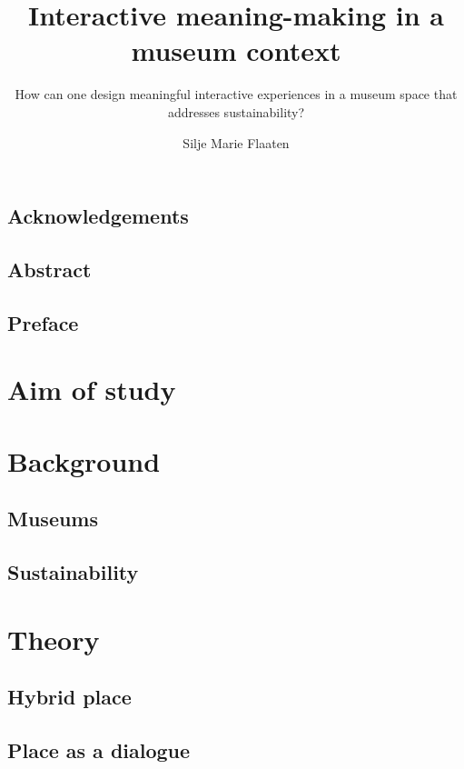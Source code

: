 \documentclass[UKenglish]{ifimaster}
\title{Interactive meaning-making in a museum context}
\subtitle{How can one design meaningful interactive experiences in a museum space that addresses sustainability?}
\author{Silje Marie Flaaten}
\begin{document}
\duoforside[dept={Department of Informatics}, program={Informatics: design, use, interaction},long]



\frontmatter{}
\chapter*{Acknowledgements}


\chapter*{Abstract}


\tableofcontents{}
\listoffigures{}

\chapter*{Preface}


\mainmatter{}
\part{Aim of study}



\part{Background}
\chapter{Museums}

\chapter{Sustainability}


\part{Theory}
\chapter{Hybrid place}

\chapter{Place as a dialogue}

\end{document}
